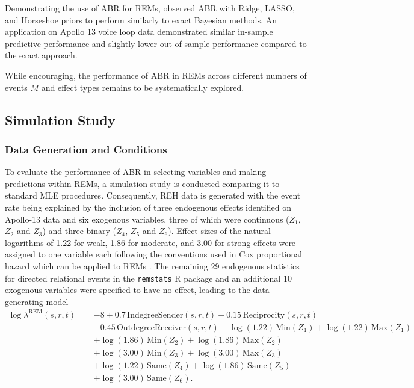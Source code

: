 \documentclass{article}
\begin{document}
\begin{spacing}{2}
\begin{justify}
Demonstrating the use of ABR for REMs, \citet{Karimova2024} observed ABR with Ridge, LASSO, and Horseshoe priors to perform similarly to exact Bayesian methods. An application on Apollo 13 voice loop data demonstrated similar in-sample predictive performance and slightly lower out-of-sample performance compared to the exact approach.

While encouraging, the performance of ABR in REMs across different numbers of events $M$ and effect types remains to be systematically explored.

\subsection{Simulation Study}

\subsubsection{Data Generation and Conditions}

To evaluate the performance of ABR in selecting variables and making predictions within REMs, a simulation study is conducted comparing it to standard MLE procedures. Consequently, REH data is generated with the event rate being explained by the inclusion of three endogenous effects identified on Apollo-13 data \citep{ShafieeKamalabad2023} and six exogenous variables, three of which were continuous ($Z_1$, $Z_2$ and $Z_3$) and three binary ($Z_4$, $Z_5$ and $Z_6$). Effect sizes of the natural logarithms of 1.22 for weak, 1.86 for moderate, and 3.00 for strong effects were assigned to one variable each following the conventions used in Cox proportional hazard which can be applied to REMs \citep{Olivier2017, Schecter2020}. The remaining 29 endogenous statistics for directed relational events in the \texttt{remstats} R package \citep{remstats} and an additional 10 exogenous variables were specified to have no effect, leading to the data generating model
\begin{equation}
\begin{aligned}
    \log \lambda^{\text{REM}}(s,r,t) = & -8 + 0.7 \, \text{IndegreeSender}(s,r,t) + 0.15 \, \text{Reciprocity}(s,r,t) \\
    & - 0.45 \, \text{OutdegreeReceiver}(s,r,t) + \log(1.22) \, \text{Min}(Z_1) + \log(1.22) \, \text{Max}(Z_1) \\
    & + \log(1.86) \, \text{Min}(Z_2) + \log(1.86) \, \text{Max}(Z_2) \\
    & + \log(3.00) \, \text{Min}(Z_3) + \log(3.00) \, \text{Max}(Z_3) \\
    & + \log(1.22) \, \text{Same}(Z_4) + \log(1.86) \, \text{Same}(Z_5) \\
    & + \log(3.00) \, \text{Same}(Z_6) \text{.}
\end{aligned}
\label{eq:rem_model}
\end{equation}


\end{justify}
\end{spacing}
\end{document}
